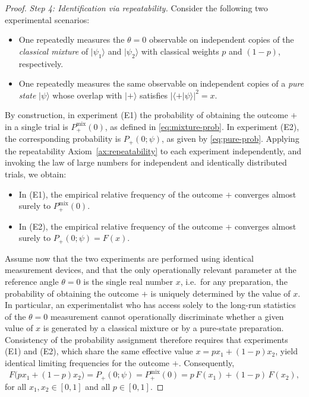 \documentclass[11pt,a4paper]{article}
\numberwithin{equation}{section}
\theoremstyle{definition}
\begin{document}
\begin{proof}
\medskip\noindent
\emph{Step 4: Identification via repeatability.}
Consider the following two experimental scenarios:

\begin{itemize}
\item[(E1)] One repeatedly measures the $\theta=0$ observable on independent copies of the \emph{classical mixture} of
$|\psi_1\rangle$ and $|\psi_2\rangle$ with classical weights $p$ and
$(1-p)$, respectively.
\item[(E2)] One repeatedly measures the same observable on independent copies of a \emph{pure state} $|\psi\rangle$ whose overlap with
$|+\rangle$ satisfies $|\langle +|\psi\rangle|^2 = x$.
\end{itemize}

By construction, in experiment (E1) the probability of obtaining the outcome $+$ in a single trial is $P_+^{\mathrm{mix}}(0)$, as defined in
\eqref{eq:mixture-prob}. In experiment (E2), the corresponding probability is $P_+(0;\psi)$, as given by \eqref{eq:pure-prob}. Applying the repeatability Axiom~\ref{ax:repeatability} to each experiment independently, and invoking the law of large numbers for independent and identically distributed trials, we obtain:
\begin{itemize}
\item In (E1), the empirical relative frequency of the outcome $+$ converges almost surely to $P_+^{\mathrm{mix}}(0)$.
\item In (E2), the empirical relative frequency of the outcome $+$ converges almost surely to $P_+(0;\psi)=F(x)$.
\end{itemize}

Assume now that the two experiments are performed using identical measurement devices, and that the only operationally relevant parameter at the reference angle $\theta=0$ is the single real number $x$, i.e.\ for any preparation, the probability of obtaining the outcome $+$ is uniquely determined by the value of $x$. In particular, an experimentalist who has access solely to the long-run statistics of the $\theta=0$ measurement cannot operationally discriminate whether a given value of $x$ is generated by a classical mixture or by a pure-state preparation. Consistency of the probability assignment therefore requires that experiments (E1) and (E2), which share the same effective value $x = p x_1 + (1-p)x_2$, yield identical limiting frequencies for the outcome $+$. Consequently,
\[
F\bigl(p x_1 + (1-p)x_2\bigr)
=
P_+(0;\psi)
=
P_+^{\mathrm{mix}}(0)
=
p\,F(x_1) + (1-p)\,F(x_2),
\]
for all $x_1,x_2\in[0,1]$ and all $p\in[0,1]$.


\end{proof}
\end{document}
